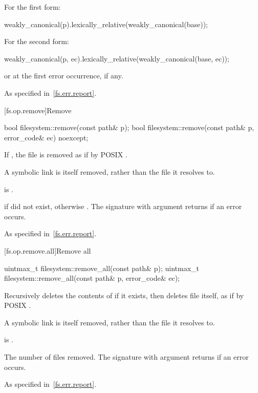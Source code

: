 \begin{itemdescr}
\pnum
\returns
For the first form:
\begin{codeblock}
weakly_canonical(p).lexically_relative(weakly_canonical(base));
\end{codeblock}
  For the second form:
\begin{codeblock}
weakly_canonical(p, ec).lexically_relative(weakly_canonical(base, ec));
\end{codeblock}
  or  at the first error occurrence, if any.

\pnum
\throws
As specified in~\ref{fs.err.report}.
\end{itemdescr}

[fs.op.remove]{Remove}

%
\begin{itemdecl}
bool filesystem::remove(const path& p);
bool filesystem::remove(const path& p, error_code& ec) noexcept;
\end{itemdecl}

\begin{itemdescr}
\pnum
\effects
If , the file  is
  removed as if by POSIX .
\begin{note}
A symbolic link is itself removed, rather than the file it
  resolves to.
\end{note}

\pnum
\ensures
{} is .

\pnum
\returns
{} if  did not exist,
  otherwise . The signature with argument 
  returns  if an error occurs.

\pnum
\throws
As specified in~\ref{fs.err.report}.
\end{itemdescr}


[fs.op.remove.all]{Remove all}

%
\begin{itemdecl}
uintmax_t filesystem::remove_all(const path& p);
uintmax_t filesystem::remove_all(const path& p, error_code& ec);
\end{itemdecl}

\begin{itemdescr}
\pnum
\effects
Recursively deletes the contents of  if it exists,
  then deletes file  itself, as if by POSIX .
\begin{note}
A symbolic link is itself removed, rather than the file it
  resolves to.
\end{note}

\pnum
\ensures
{} is .

\pnum
\returns
The number of files removed. The signature with argument
   returns  if an error
  occurs.

\pnum
\throws
As specified in~\ref{fs.err.report}.
\end{itemdescr}


